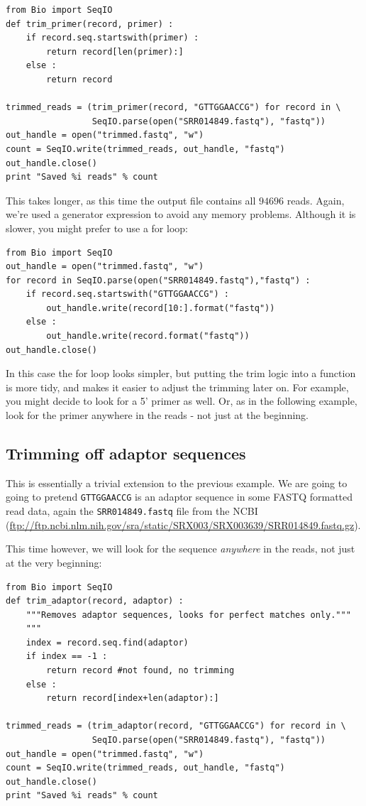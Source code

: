 \documentclass{report}
\begin{document}
\begin{verbatim}
from Bio import SeqIO
def trim_primer(record, primer) :
    if record.seq.startswith(primer) :
        return record[len(primer):]
    else :
        return record

trimmed_reads = (trim_primer(record, "GTTGGAACCG") for record in \
                 SeqIO.parse(open("SRR014849.fastq"), "fastq"))
out_handle = open("trimmed.fastq", "w")
count = SeqIO.write(trimmed_reads, out_handle, "fastq")
out_handle.close()
print "Saved %i reads" % count
\end{verbatim}

This takes longer, as this time the output file contains all $94696$ reads.
Again, we're used a generator expression to avoid any memory problems.
Although it is slower, you might prefer to use a for loop:

\begin{verbatim}
from Bio import SeqIO
out_handle = open("trimmed.fastq", "w")
for record in SeqIO.parse(open("SRR014849.fastq"),"fastq") :
    if record.seq.startswith("GTTGGAACCG") :
        out_handle.write(record[10:].format("fastq"))
    else :
        out_handle.write(record.format("fastq"))
out_handle.close()
\end{verbatim}

In this case the for loop looks simpler, but putting the trim logic into a
function is more tidy, and makes it easier to adjust the trimming later on.
For example, you might decide to look for a 5' primer as well. Or, as in
the following example, look for the primer anywhere in the reads - not
just at the beginning.

\subsection{Trimming off adaptor sequences}
\label{sec:FASTQ-slicing-off-adaptor}

This is essentially a trivial extension to the previous example. We are going
to going to pretend \texttt{GTTGGAACCG} is an adaptor sequence in some FASTQ
formatted read data, again the \texttt{SRR014849.fastq} file from the NCBI
(\url{ftp://ftp.ncbi.nlm.nih.gov/sra/static/SRX003/SRX003639/SRR014849.fastq.gz}).

This time however, we will look for the sequence \emph{anywhere} in the reads,
not just at the very beginning:

\begin{verbatim}
from Bio import SeqIO
def trim_adaptor(record, adaptor) :
    """Removes adaptor sequences, looks for perfect matches only."""
    """
    index = record.seq.find(adaptor)
    if index == -1 :
        return record #not found, no trimming
    else :
        return record[index+len(adaptor):]

trimmed_reads = (trim_adaptor(record, "GTTGGAACCG") for record in \
                 SeqIO.parse(open("SRR014849.fastq"), "fastq")) 
out_handle = open("trimmed.fastq", "w") 
count = SeqIO.write(trimmed_reads, out_handle, "fastq") 
out_handle.close() 
print "Saved %i reads" % count
\end{verbatim}
\end{document}
